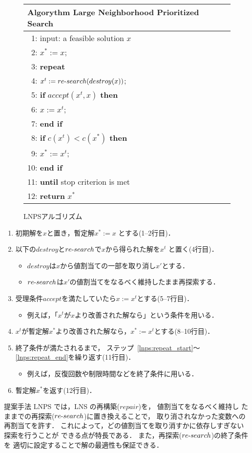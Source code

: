 \begin{figure}[htb]\centering
\begin{tabular}{l}\hline
\textbf{Algorythm} Large Neighborhood Prioritized Search\\\hline
 ~1: input: a feasible solution $x$ \\
 ~2: $x^{*} :=  x$; \\
 ~3: \bf{repeat} \\
 ~4: \quad \quad $x^{t} := re\mathchar`-search(destroy(x))$; \\
 ~5: \quad \quad \textbf{if} $accept(x^{t}, x)$ \textbf{then} \\
 ~6: \quad \quad \quad \quad $x := x^{t}$; \\
 ~7: \quad \quad \textbf{end if} \\
 ~8: \quad \quad \textbf{if} $c(x^{t}) < c(x^{*})$ \textbf{then} \\
 ~9: \quad \quad \quad \quad $x^{*} := x^{t}$; \\
10: \quad \quad \textbf{end if} \\
11: \textbf{until} stop criterion is met \\
12: \textbf{return} $x^{*}$ \\ \hline
\end{tabular}
\caption{LNPSアルゴリズム}
\label{algo:lnps}
\end{figure}

\begin{enumerate}\compress
\item 初期解を$x$と置き，暫定解$x^{*} := x$ とする(1--2行目)．
\item \label{lnps:repeat_start}
  以下の$destroy$と$re\mathchar`-search$で$x$から得られた解を$x^{t}$
  と置く(4行目)．
  \begin{itemize}\compress
  \item $destroy$は$x$から値割当ての一部を取り消し$x'$とする．
  \item $re\mathchar`-search$は$x'$の値割当てをなるべく維持したまま再探索する．
  \end{itemize}
\item 受理条件$accept$を満たしていたら$x := x^{t}$とする(5--7行目)．
  \begin{itemize}\compress
  \item 例えば，「$x^{t}$が$x$より改善された解なら」という条件を用いる．
  \end{itemize}
\item \label{lnps:repeat_end}
  $x^{t}$が暫定解$x^{*}$より改善された解なら，$x^{*} := x^{t}$とする(8--10行目)．
\item 終了条件が満たされるまで，
  ステップ~\ref{lnps:repeat_start}〜\ref{lnps:repeat_end}を繰り返す(11行目)．
  \begin{itemize}\compress
  \item 例えば，反復回数や制限時間などを終了条件に用いる．
  \end{itemize}
\item 暫定解$x^{*}$を返す(12行目)．
\end{enumerate}

提案手法 LNPS では，LNS の再構築($repair$)を，
値割当てをなるべく維持し
たままでの再探索($re\mathchar`-search$)に置き換えることで，
取り消されなかった変数への再割当てを許す．
これによって，どの値割当てを取り消すかに依存しすぎない探索を行うことが
できる点が特長である．
また，再探索($re\mathchar`-search$)の終了条件を
適切に設定することで解の最適性も保証できる．

